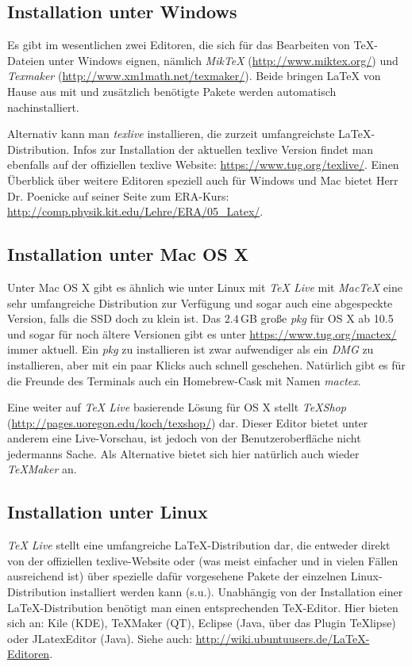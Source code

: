\subsection{Installation unter Windows}
Es gibt im wesentlichen zwei Editoren, die sich für das Bearbeiten von TeX-Dateien unter Windows eignen, nämlich \textit{MikTeX} (\url{http://www.miktex.org/}) und \textit{Texmaker} (\url{http://www.xm1math.net/texmaker/}). Beide bringen LaTeX von Hause aus mit und zusätzlich benötigte Pakete werden automatisch nachinstalliert.

Alternativ kann man \textit{texlive} installieren, die zurzeit umfangreichste LaTeX-Distribution. Infos zur Installation der aktuellen texlive Version findet man ebenfalls auf der offiziellen texlive Website: \url{https://www.tug.org/texlive/}. Einen Überblick über weitere Editoren speziell auch für Windows und Mac bietet Herr Dr. Poenicke auf seiner Seite zum ERA-Kurs: \url{http://comp.physik.kit.edu/Lehre/ERA/05_Latex/}.

\subsection{Installation unter Mac OS X}
Unter Mac OS X gibt es ähnlich wie unter Linux mit \textit{TeX Live} mit \textit{MacTeX} eine sehr umfangreiche Distribution zur Verfügung und sogar auch eine abgespeckte Version, falls die SSD doch zu klein ist. Das $2.4$\,GB große \textit{pkg} für OS X ab 10.5 und sogar für noch ältere Versionen gibt es unter \url{https://www.tug.org/mactex/} immer aktuell. Ein \textit{pkg} zu installieren ist zwar aufwendiger als ein \textit{DMG} zu installieren, aber mit ein paar Klicks auch schnell geschehen. Natürlich gibt es für die Freunde des Terminals auch ein Homebrew-Cask mit Namen \textit{mactex}.

Eine weiter auf \textit{TeX Live} basierende Lösung für OS X stellt \textit{TeXShop} (\url{http://pages.uoregon.edu/koch/texshop/}) dar. Dieser Editor bietet unter anderem eine Live-Vorschau, ist jedoch von der Benutzeroberfläche nicht jedermanns Sache. 
Als Alternative bietet sich hier natürlich auch wieder \textit{TeXMaker} an.

\subsection{Installation unter Linux}
\textit{TeX Live} stellt eine umfangreiche LaTeX-Distribution dar, die entweder direkt von der offiziellen texlive-Website oder (was meist einfacher und in vielen Fällen ausreichend ist) über spezielle dafür vorgesehene Pakete der einzelnen Linux-Distribution installiert werden kann (s.u.). Unabhängig von der Installation einer LaTeX-Distribution benötigt man einen entsprechenden TeX-Editor. Hier bieten sich an: Kile (KDE), TeXMaker (QT), Eclipse (Java, über das Plugin TeXlipse) oder JLatexEditor (Java). Siehe auch: \url{http://wiki.ubuntuusers.de/LaTeX-Editoren}.

